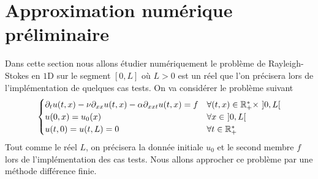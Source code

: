 \section{Approximation numérique préliminaire}\label{Chapitre_3}
Dans cette section nous allons étudier numériquement le problème de Rayleigh-Stokes en $1$D sur le segment $[0, L]$ où $L>0$ est un réel que l'on précisera lors de l'implémentation de quelques cas tests. On va considérer le problème suivant
\begin{equation*}
\begin{cases}
    \partial_tu(t,x) - \nu\partial_{xx} u(t,x) - \alpha\partial_{xxt} u(t,x) = f & \forall (t,x) \in  \mathbb{R}_+^* \times \ ]0,L[  \\
    u(0,x) = u_0(x) & \forall x \in \ ]0,L[ \\
    u(t, 0) = u(t,L) = 0 & \forall t \in \mathbb{R}_+^*
\end{cases}
\end{equation*}
Tout comme le réel $L$, on précisera la donnée initiale $u_0$ et le second membre $f$ lors de l'implémentation des cas tests. Nous allons approcher ce problème par une méthode différence finie.

